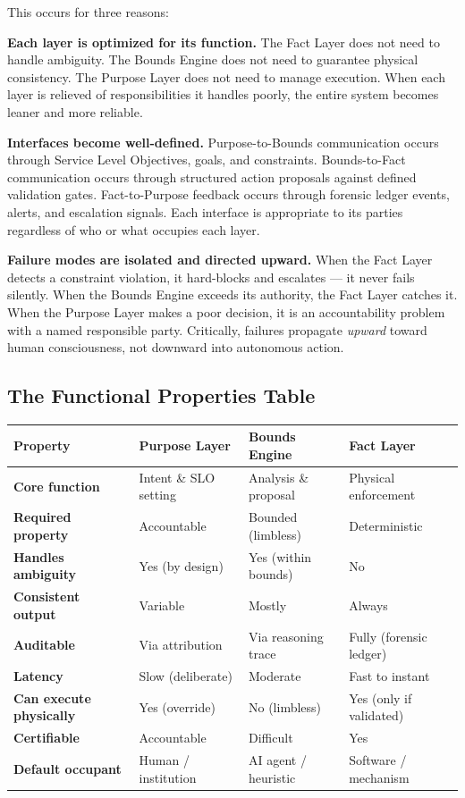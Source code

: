 \documentclass[12pt]{article}
\theoremstyle{plain}
\begin{document}
This occurs for three reasons:

\textbf{Each layer is optimized for its function.} The Fact Layer does not need to handle ambiguity. The Bounds Engine does not need to guarantee physical consistency. The Purpose Layer does not need to manage execution. When each layer is relieved of responsibilities it handles poorly, the entire system becomes leaner and more reliable.

\textbf{Interfaces become well-defined.} Purpose-to-Bounds communication occurs through Service Level Objectives, goals, and constraints. Bounds-to-Fact communication occurs through structured action proposals against defined validation gates. Fact-to-Purpose feedback occurs through forensic ledger events, alerts, and escalation signals. Each interface is appropriate to its parties regardless of who or what occupies each layer.

\textbf{Failure modes are isolated and directed upward.} When the Fact Layer detects a constraint violation, it hard-blocks and escalates --- it never fails silently. When the Bounds Engine exceeds its authority, the Fact Layer catches it. When the Purpose Layer makes a poor decision, it is an accountability problem with a named responsible party. Critically, failures propagate \textit{upward} toward human consciousness, not downward into autonomous action.

\subsection{The Functional Properties Table}

\begin{center}
\begin{tabular}{>{\bfseries}p{2.6cm} p{3.3cm} p{3.3cm} p{3.3cm}}
\toprule
\textbf{Property} & \textbf{Purpose Layer} & \textbf{Bounds Engine} & \textbf{Fact Layer} \\
\midrule
Core function & Intent \& SLO setting & Analysis \& proposal & Physical enforcement \\
\addlinespace
Required property & Accountable & Bounded (limbless) & Deterministic \\
\addlinespace
Handles ambiguity & Yes (by design) & Yes (within bounds) & No \\
\addlinespace
Consistent output & Variable & Mostly & Always \\
\addlinespace
Auditable & Via attribution & Via reasoning trace & Fully (forensic ledger) \\
\addlinespace
Latency & Slow (deliberate) & Moderate & Fast to instant \\
\addlinespace
Can execute physically & Yes (override) & No (limbless) & Yes (only if validated) \\
\addlinespace
Certifiable & Accountable & Difficult & Yes \\
\addlinespace
Default occupant & Human / institution & AI agent / heuristic & Software / mechanism \\
\bottomrule
\end{tabular}
\end{center}
\end{document}

